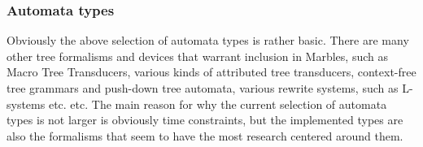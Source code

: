 \subsubsection{Automata types}

Obviously the above selection of automata types is rather basic. There are
many other tree formalisms and devices that warrant inclusion in Marbles,
such as Macro Tree Transducers, various kinds of attributed tree
transducers, context-free tree grammars and push-down tree automata,
various rewrite systems, such as L-systems etc. etc. The main reason for
why the current selection of automata types is not larger is obviously time
constraints, but the implemented types are also the formalisms that seem to
have the most research centered around them.

